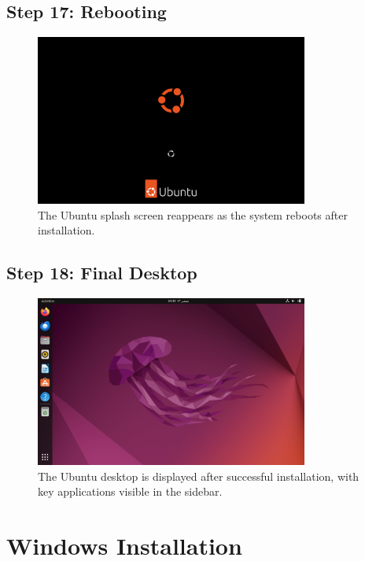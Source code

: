 \documentclass{article}
\begin{document}
\subsection{Step 17: Rebooting}
\begin{figure}[H]
    \centering
    \includegraphics[width=0.8\textwidth]{2024-09-17_04-41-51.png}
    \caption{The Ubuntu splash screen reappears as the system reboots after installation.}
\end{figure}

\subsection{Step 18: Final Desktop}
\begin{figure}[H]
    \centering
    \includegraphics[width=0.8\textwidth]{2024-09-17_04-42-40.png}
    \caption{The Ubuntu desktop is displayed after successful installation, with key applications visible in the sidebar.}
\end{figure}

\section{Windows Installation}
\end{document}
